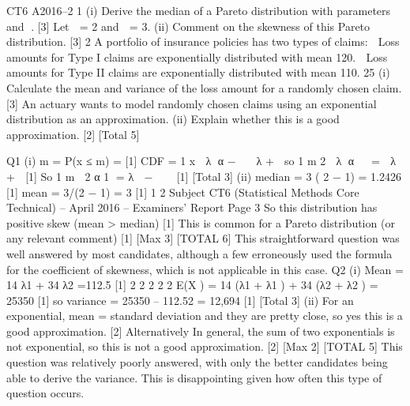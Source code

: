 CT6 A2016–2
1 (i) Derive the median of a Pareto distribution with parameters  and . [3]
Let  = 2 and  = 3.
(ii) Comment on the skewness of this Pareto distribution. [3]
  2 A portfolio of insurance policies has two types of claims:
   Loss amounts for Type I claims are exponentially distributed with mean 120.
 Loss amounts for Type II claims are exponentially distributed with mean 110.
25%
(i) Calculate the mean and variance of the loss amount for a randomly chosen
claim. [3]
An actuary wants to model randomly chosen claims using an exponential
distribution as an approximation.
(ii) Explain whether this is a good approximation. [2]
[Total 5]

  Q1 (i) m = P(x ≤ m) =
  [1]
CDF = 1
x
 λ α −   λ + 
so 1
m 2
 λ α   =  λ + 
[1]
So
1
m  2 α 1 = λ  − 
 
[1]
[Total 3]
(ii) median = 3 ( 2 − 1) = 1.2426 [1]
mean = 3/(2 − 1) = 3 [1]
1
2
Subject CT6 (Statistical Methods Core Technical) – April 2016 – Examiners’ Report
Page 3
So this distribution has positive skew (mean > median) [1]
This is common for a Pareto distribution (or any relevant comment) [1]
[Max 3]
[TOTAL 6]
This straightforward question was well answered by most candidates,
although a few erroneously used the formula for the coefficient of skewness,
which is not applicable in this case.
Q2 (i) Mean = 14 λ1 + 34 λ2 =112.5 [1]
2 2 2 2 2
E(X ) = 14 (λ1 + λ1 ) + 34 (λ2 + λ2 ) = 25350 [1]
so variance = 25350 – 112.52 = 12,694 [1]
[Total 3]
(ii) For an exponential, mean = standard deviation and they are pretty close, so yes
this is a good approximation. [2]
Alternatively
In general, the sum of two exponentials is not exponential, so this is not a
good approximation. [2]
[Max 2]
[TOTAL 5]
This question was relatively poorly answered, with only the better candidates
being able to derive the variance. This is disappointing given how often this
type of question occurs.
